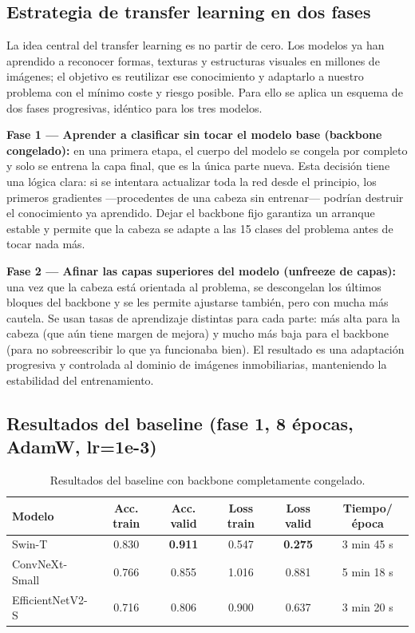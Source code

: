 \documentclass[11pt,a4paper]{article}
\begin{document}
\subsection{Estrategia de transfer learning en dos fases}

La idea central del transfer learning es no partir de cero. Los modelos ya han aprendido a reconocer formas, texturas y estructuras visuales en millones de imágenes; el objetivo es reutilizar ese conocimiento y adaptarlo a nuestro problema con el mínimo coste y riesgo posible. Para ello se aplica un esquema de dos fases progresivas, idéntico para los tres modelos.

\textbf{Fase 1 — Aprender a clasificar sin tocar el modelo base (backbone congelado):} en una primera etapa, el cuerpo del modelo se congela por completo y solo se entrena la capa final, que es la única parte nueva. Esta decisión tiene una lógica clara: si se intentara actualizar toda la red desde el principio, los primeros gradientes —procedentes de una cabeza sin entrenar— podrían destruir el conocimiento ya aprendido. Dejar el backbone fijo garantiza un arranque estable y permite que la cabeza se adapte a las 15 clases del problema antes de tocar nada más.

\textbf{Fase 2 — Afinar las capas superiores del modelo (unfreeze de capas):} una vez que la cabeza está orientada al problema, se descongelan los últimos bloques del backbone y se les permite ajustarse también, pero con mucha más cautela. Se usan tasas de aprendizaje distintas para cada parte: más alta para la cabeza (que aún tiene margen de mejora) y mucho más baja para el backbone (para no sobreescribir lo que ya funcionaba bien). El resultado es una adaptación progresiva y controlada al dominio de imágenes inmobiliarias, manteniendo la estabilidad del entrenamiento.

\subsection{Resultados del baseline (fase 1, 8 épocas, AdamW, lr=1e-3)}

\begin{table}[H]
    \centering
    \caption{Resultados del baseline con backbone completamente congelado.}
    \label{tab:baseline-modelos}
    \begin{tabular}{lccccc}
        \toprule
        Modelo & Acc. train & Acc. valid & Loss train & Loss valid & Tiempo/época \\
        \midrule
        Swin-T           & 0.830 & \textbf{0.911} & 0.547 & \textbf{0.275} & 3 min 45 s \\
        ConvNeXt-Small   & 0.766 & 0.855          & 1.016 & 0.881          & 5 min 18 s \\
        EfficientNetV2-S & 0.716 & 0.806          & 0.900 & 0.637          & 3 min 20 s \\
        \bottomrule
    \end{tabular}
\end{table}
\end{document}
